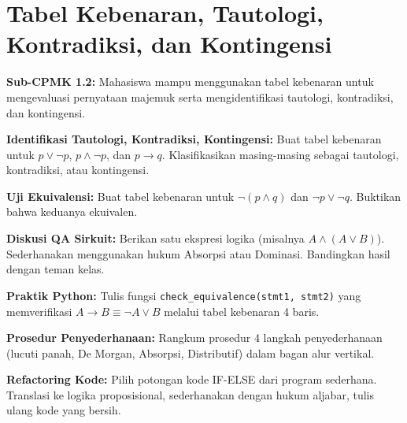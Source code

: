 \documentclass[../main]{subfiles}
\begin{document}
\chapter{Tabel Kebenaran, Tautologi, Kontradiksi, dan Kontingensi}

\begin{subcpmk}
  \item \textbf{Sub-CPMK 1.2:} Mahasiswa mampu menggunakan tabel kebenaran untuk mengevaluasi pernyataan majemuk serta mengidentifikasi tautologi, kontradiksi, dan kontingensi.
\end{subcpmk}










\begin{aktivitas}
  \item \textbf{Identifikasi Tautologi, Kontradiksi, Kontingensi:} Buat tabel kebenaran untuk $p \vee \neg p$, $p \wedge \neg p$, dan $p \rightarrow q$. Klasifikasikan masing-masing sebagai tautologi, kontradiksi, atau kontingensi.
  \item \textbf{Uji Ekuivalensi:} Buat tabel kebenaran untuk $\neg(p \wedge q)$ dan $\neg p \vee \neg q$. Buktikan bahwa keduanya ekuivalen.
  \item \textbf{Diskusi QA Sirkuit:} Berikan satu ekspresi logika (misalnya $A \wedge (A \vee B)$). Sederhanakan menggunakan hukum Absorpsi atau Dominasi. Bandingkan hasil dengan teman kelas.
  \item \textbf{Praktik Python:} Tulis fungsi \texttt{check\_equivalence(stmt1, stmt2)} yang memverifikasi $A \rightarrow B \equiv \neg A \vee B$ melalui tabel kebenaran 4 baris.
  \item \textbf{Prosedur Penyederhanaan:} Rangkum prosedur 4 langkah penyederhanaan (lucuti panah, De Morgan, Absorpsi, Distributif) dalam bagan alur vertikal.
  \item \textbf{Refactoring Kode:} Pilih potongan kode IF-ELSE dari program sederhana. Translasi ke logika proposisional, sederhanakan dengan hukum aljabar, tulis ulang kode yang bersih.
\end{aktivitas}
\end{document}
